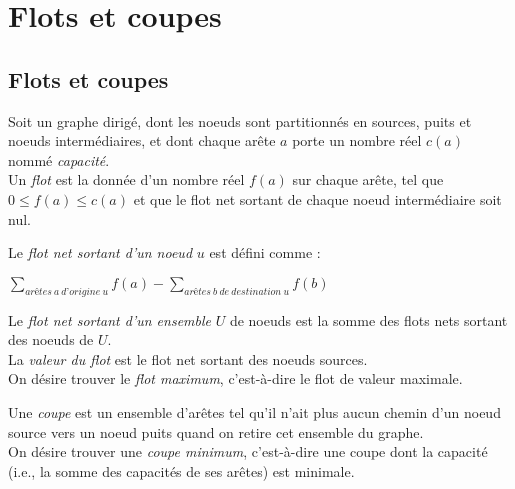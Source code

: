 \section{Flots et coupes}
\subsection{Flots et coupes}
\begin{mydef}
  Soit un graphe dirigé, dont les noeuds sont partitionnés en sources, puits et noeuds intermédiaires, et dont chaque arête $a$ porte un nombre réel $c(a)$ nommé \emph{capacité}.\\
  Un \emph{flot} est la donnée d’un nombre réel $f(a)$ sur chaque arête, tel que $0 \leq f(a) \leq c(a)$ et que le flot net sortant de chaque noeud intermédiaire soit nul.
\end{mydef}

\begin{mydef}
  Le \emph{flot net sortant d’un noeud} $u$ est défini comme : 
  \begin{center}
  $\sum_{arêtes\ a\ d’origine\ u} f(a) − \sum_{arêtes\ b\ de\ destination\ u} f(b)$
  \end{center}
  Le \emph{flot net sortant d’un ensemble} $U$ de noeuds est la somme des flots nets sortant des noeuds de $U$.\\
  La \emph{valeur du flot} est le flot net sortant des noeuds sources.\\
  On désire trouver le \emph{flot maximum}, c’est-à-dire le flot de valeur maximale.
\end{mydef}

\begin{mydef}
  Une \emph{coupe} est un ensemble d’arêtes tel qu’il n’ait plus aucun chemin d’un noeud source vers un noeud puits quand on retire cet ensemble du graphe.\\
  On désire trouver une \emph{coupe minimum}, c’est-à-dire une coupe dont la capacité (i.e., la somme des capacités de ses arêtes) est minimale.
\end{mydef}

\begin{center}
\end{center}

